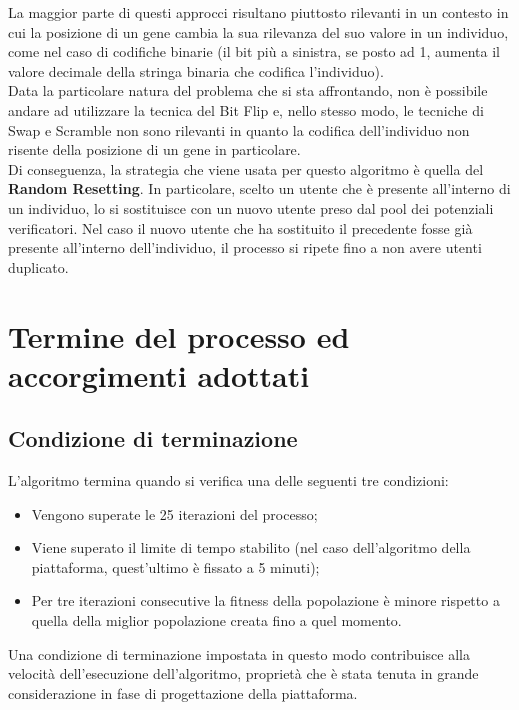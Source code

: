         La maggior parte di questi approcci risultano piuttosto rilevanti in un contesto in cui la posizione di un gene cambia la sua rilevanza del suo valore in un individuo, come nel caso di codifiche binarie (il bit più a sinistra, se posto ad 1, aumenta il valore decimale della stringa binaria che codifica l'individuo). \\
        Data la particolare natura del problema che si sta affrontando, non è possibile andare ad utilizzare la tecnica del Bit Flip e, nello stesso modo, le tecniche di Swap e Scramble non sono rilevanti in quanto la codifica dell'individuo non risente della posizione di un gene in particolare. \\
        Di conseguenza, la strategia che viene usata per questo algoritmo è quella del \textbf{Random Resetting}. In particolare, scelto un utente che è presente all'interno di un individuo, lo si sostituisce con un nuovo utente preso dal pool dei potenziali verificatori. Nel caso il nuovo utente che ha sostituito il precedente fosse già presente all'interno dell'individuo, il processo si ripete fino a non avere utenti duplicato.
\section{Termine del processo ed accorgimenti adottati}

    \subsection{Condizione di terminazione}
        L'algoritmo termina quando si verifica una delle seguenti tre condizioni:

        \begin{itemize}
            \item Vengono superate le 25 iterazioni del processo;
            \item Viene superato il limite di tempo stabilito (nel caso dell'algoritmo della piattaforma, quest'ultimo è fissato a 5 minuti);
            \item Per tre iterazioni consecutive la fitness della popolazione è minore rispetto a quella della miglior popolazione creata fino a quel momento.
        \end{itemize}

        Una condizione di terminazione impostata in questo modo contribuisce alla velocità dell'esecuzione dell'algoritmo, proprietà che è stata tenuta in grande considerazione in fase di progettazione della piattaforma.

